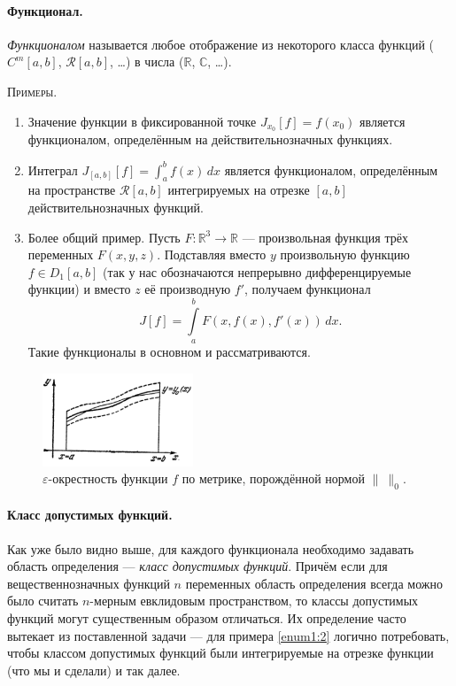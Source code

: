 \paragraph{Функционал.}
\begin{definition}
\emph{Функционалом}
называется любое отображение из некоторого класса функций ($ C^m[a, b] $, $
\mathscr R[a,b] $, \ldots) в числа
($ \mathbb R $, $ \mathbb C $, \ldots). 
\end{definition}

\textsc{Примеры.}
\begin{enumerate}
  \item Значение функции в фиксированной точке $ J_{x_0}[f] = f(x_0) $
    является функционалом, определённым на действительнозначных функциях.
  \item\label{enum1:2} Интеграл $ J_{[a,b]}[f] = \int_{a}^{b} f(x)\,dx $ является
    функционалом, определённым на пространстве $ \mathscr{R}[a,b] $
    интегрируемых на отрезке $ [a,b] $ действительнозначных функций.
  \item Более общий пример. Пусть $ F\colon \mathbb R^3 \to \mathbb R $ ---
    произвольная функция трёх переменных $ F(x, y, z) $. Подставляя вместо $ y $
    произвольную функцию $ f \in D_1[a, b] $ (так у нас обозначаются непрерывно
    дифференцируемые функции) и вместо $ z $ её производную $ f'
    $, получаем функционал  
    \[
      J[f] = \int\limits_{a}^{b}F(x, f(x), f'(x))\,dx.
    \]
   Такие функционалы в основном и рассматриваются. 
\end{enumerate}

\begin{figure}
  \centering
  \includegraphics[width=0.4\textwidth]{Figures/norm_0.png}
  \caption{$ \varepsilon $-окрестность функции $ f $ по метрике, порождённой
  нормой $ \|\ \|_0 $.}
  \label{fig:norm_0}
\end{figure}
\paragraph{Класс допустимых функций.} Как уже было видно выше, для каждого
функционала необходимо задавать область определения --- \emph{класс допустимых
функций}. Причём если для вещественнозначных функций $ n $ переменных область
определения всегда можно было считать $ n $-мерным евклидовым пространством, то
классы допустимых функций могут существенным образом отличаться. Их определение
часто вытекает из поставленной задачи --- для примера \ref{enum1:2} логично
потребовать, чтобы классом допустимых функций были интегрируемые на отрезке
функции (что мы и сделали) и так далее.

